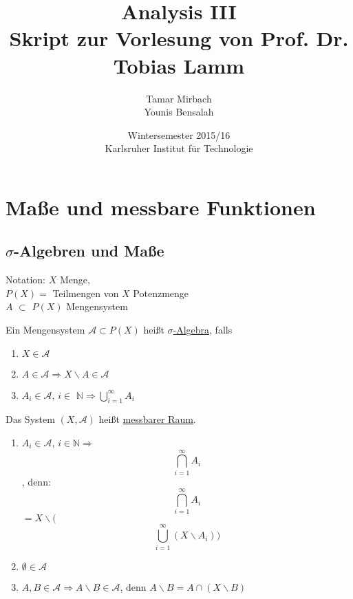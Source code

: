 \documentclass[11pt]{memoir}
\begin{document}
\title{\textbf{Analysis III}\\ Skript zur Vorlesung von Prof. Dr. Tobias Lamm}
\author{Tamar Mirbach\\ Younis Bensalah}
\date{Wintersemester 2015/16\\ Karlsruher Institut für Technologie}

\maketitle

\chapter{Maße und messbare Funktionen}
\section{$\sigma$-Algebren und Maße}
Notation: $X$ Menge, \\ $P(X) =$ \textbraceleft Teilmengen von $X$\textbraceright  {} Potenzmenge \\
$A$ $\subset$  $P(X)$ Mengensystem
\begin{Definition}
Ein Mengensystem $\mathscr{A} \subset P(X)$ heißt \underline{$\sigma$-Algebra}, falls
\begin{enumerate}
	\item $X \in \mathscr{A}$
	\item $A \in \mathscr{A} \Rightarrow X \backslash A \in \mathscr{A}$
	\item $A_i \in \mathscr{A}$, $i \in$ $\mathbb{N} \Rightarrow \bigcup_{i = 1}^{\infty} A_i$
\end{enumerate}
Das System $(X, \mathscr{A})$ heißt \underline{messbarer Raum}.
\end{Definition}

\begin{Bemerkung} %
\begin{enumerate}
	\item $A_i \in \mathscr{A}$, $i \in \mathbb{N} \Rightarrow $ $$\bigcap_{i = 1}^{\infty} A_i$$, denn:
	$$\bigcap_{i=1}^{\infty} A_i $$ $= X\backslash ($ $$\bigcup_{i=1}^{\infty} (X \backslash A_i))$$
	\item $\emptyset \in \mathscr{A}$
	\item $A, B \in \mathscr{A} \Rightarrow A \backslash B \in \mathscr{A}$, denn $A \backslash B = A \cap (X \backslash B)$
\end{enumerate}
\end{Bemerkung}
\end{document}
